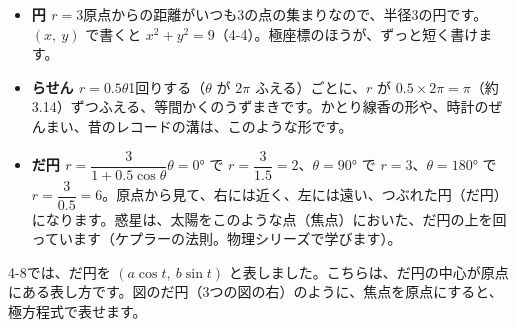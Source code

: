 \begin{itemize}[leftmargin=1.2\zw, itemsep=3pt, topsep=2pt, label={\color{\bkTT}●}]
\item \textbf{円 $r=3$}\quad 原点からの距離がいつも3の点の集まりなので、半径3の円です。$(x,\ y)$ で書くと $x^2+y^2=9$（4-4）。極座標のほうが、ずっと短く書けます。
\item \textbf{らせん $r=0.5\theta$}\quad 1回りする（$\theta$ が $2\pi$ ふえる）ごとに、$r$ が $0.5\times2\pi=\pi$（約3.14）ずつふえる、等間かくのうずまきです。かとり線香の形や、時計のぜんまい、昔のレコードの溝は、このような形です。
\item \textbf{だ円 $r=\dfrac{3}{1+0.5\cos\theta}$}\quad $\theta=0°$ で $r=\dfrac{3}{1.5}=2$、$\theta=90°$ で $r=3$、$\theta=180°$ で $r=\dfrac{3}{0.5}=6$。原点から見て、右には近く、左には遠い、つぶれた円（だ円）になります。惑星は、太陽をこのような点（焦点）においた、だ円の上を回っています（ケプラーの法則。物理シリーズで学びます）。
\end{itemize}
4-8では、だ円を $(a\cos t,\ b\sin t)$ と表しました。こちらは、だ円の中心が原点にある表し方です。図のだ円（3つの図の右）のように、焦点を原点にすると、極方程式で表せます。

